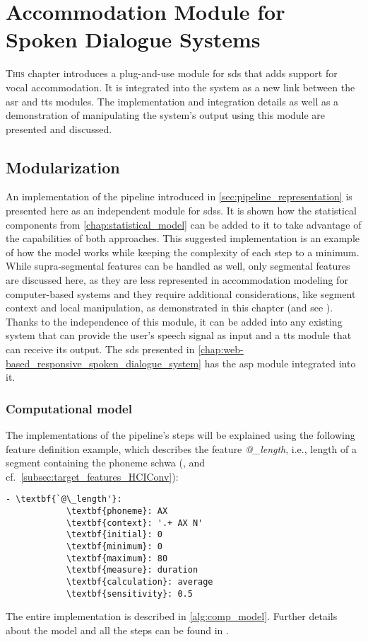\chapter[Accommodation Module for Spoken Dialogue Systems]{Accommodation Module for\\Spoken Dialogue Systems}
\label{chap:convergence_module_for_sdss}

\lettrine{T}{his} chapter introduces a plug-and-use module for \acs{sds} that adds support for vocal accommodation.
It is integrated into the system as a new link between the \acs{asr} and \acs{tts} modules.
The implementation and integration details as well as a demonstration of manipulating the system's output using this module are presented and discussed.

\pagebreak

\section{Modularization}
\label{sec:modularization}

An implementation of the pipeline introduced in \cref{sec:pipeline_representation} is presented here as an independent module for \acp{sds}.
It is shown how the statistical components from \cref{chap:statistical_model} can be added to it to take advantage of the capabilities of both approaches.
This suggested implementation is an example of how the model works while keeping the complexity of each step to a minimum.
While supra-segmental features can be handled as well, only segmental features are discussed here, as they are less represented in accommodation modeling for computer-based systems and they require additional considerations, like segment context and local manipulation, as demonstrated in this chapter (and see \citet{Raveh2017SemDial}).
Thanks to the independence of this module, it can be added into any existing system that can provide the user's speech signal as input and a \ac{tts} module that can receive its output.
The \ac{sds} presented in \cref{chap:web-based_responsive_spoken_dialogue_system} has the \ac{asp} module integrated into it.

\subsection{Computational model}
\label{subsec:computational_model}

The implementations of the pipeline's steps will be explained using the following feature definition example, which describes the feature \textit{@\_length}, i.e., length of a segment containing the phoneme schwa (\textipa{[@]}, and cf.\ \cref{subsec:target_features_HCIConv}):
%
\begin{Verbatim}[tabsize=4, commandchars=\\\{\}]
	- \textbf{`@\_length'}:
			\textbf{phoneme}: AX
			\textbf{context}: '.+ AX N'
			\textbf{initial}: 0
			\textbf{minimum}: 0 
			\textbf{maximum}: 80
			\textbf{measure}: duration
			\textbf{calculation}: average
			\textbf{sensitivity}: 0.5
\end{Verbatim}
%
The entire implementation is described in \cref{alg:comp_model}.
Further details about the model and all the steps can be found in \citet{Raveh2017Interspeech}.

